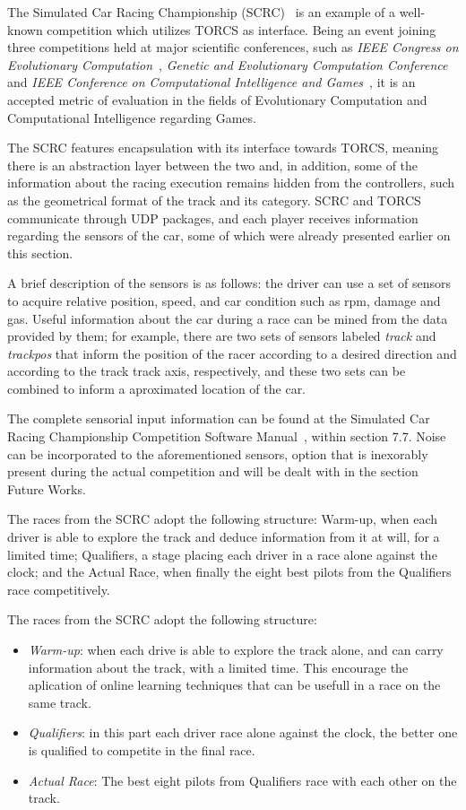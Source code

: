 	The Simulated Car Racing Championship (SCRC)~\cite{SCRC} is an example of a well-known competition which utilizes
	TORCS as interface. Being an event joining three competitions held at major scientific conferences, such as
	\emph{IEEE Congress on Evolutionary Computation}~\cite{CEC}, \emph{Genetic and Evolutionary Computation
	Conference}~\cite{GECCO} and \emph{IEEE Conference on Computational Intelligence and Games}~\cite{CIG}, it is
	an accepted	metric of evaluation in the fields of Evolutionary Computation and Computational Intelligence
	regarding Games.
	
	The SCRC features encapsulation with its interface towards TORCS, meaning there is an abstraction layer between
	the two and, in addition, some of the information about the racing execution remains hidden from the controllers,
	such as the geometrical format of the track and its category. SCRC and TORCS communicate through UDP packages,
	and each player receives information regarding the sensors of the car, some of which were already presented
	earlier on this section.
	
	A brief description of the sensors is as follows: the driver can use a set of sensors to acquire relative
	position, speed, and car condition such as rpm, damage and gas. Useful information about the car during a
	race can be mined from the data provided by them; for example, there are two sets of sensors labeled
	\emph{track} and \emph{trackpos} that inform the position of the racer according to a desired direction and
	according to the track track axis, respectively, and these two sets can be combined to inform a aproximated
	location of the car.
	
	The complete sensorial input information can be found at the Simulated Car Racing Championship Competition
	Software Manual~\cite{SCRC}, within section 7.7. Noise can be incorporated to the aforementioned sensors,
	option that is inexorably present during the actual competition and will be dealt with in the section Future
	Works.
	
	The races from the SCRC adopt the following structure: Warm-up, when each driver is able to explore the track
	and deduce information from it at will, for a limited time; Qualifiers, a stage placing each driver in a race
	alone against the clock; and the Actual Race, when finally the eight best pilots from the Qualifiers race
	competitively.


	The races from the SCRC adopt the following structure:
		\begin{itemize}
			\item \emph{Warm-up}: when each drive is able to explore the track alone, and can carry information about the track, with a limited time. This encourage the aplication of online learning techniques that can be usefull in a race on the same track.
			\item \emph{Qualifiers}: in this part each driver race alone against the clock, the better one is qualified to competite in the final race.
			\item \emph{Actual Race}: The best eight pilots from Qualifiers race with each other on the track.
		\end{itemize}